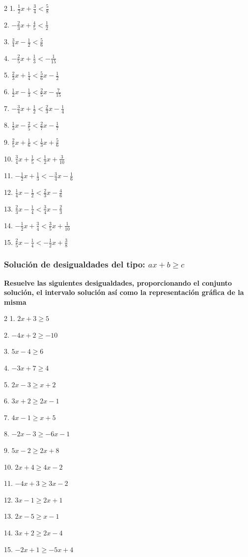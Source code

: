 \documentclass[12pt]{article}
\begin{document}
\begin{multicols}{2}
1. $\frac{1}{2}x+\frac{3}{4}<\frac{5}{8}$

2. $-\frac{2}{3}x+\frac{4}{5}<\frac{1}{2}$

3. $\frac{3}{4}x-\frac{1}{2}<\frac{5}{6}$

4. $-\frac{2}{5}x+\frac{1}{3}<-\frac{1}{15}$

5. $\frac{2}{3}x+\frac{1}{4}<\frac{5}{6}x-\frac{1}{2}$

6. $\frac{1}{2}x-\frac{1}{3}<\frac{2}{5}x-\frac{7}{15}$

7. $-\frac{3}{4}x+\frac{1}{2}<\frac{2}{3}x-\frac{1}{4}$

8. $\frac{1}{3}x-\frac{2}{5}<\frac{2}{7}x-\frac{1}{7}$

9. $\frac{2}{5}x+\frac{1}{6}<\frac{1}{3}x+\frac{5}{6}$

10. $\frac{3}{4}x+\frac{1}{5}<\frac{1}{2}x+\frac{3}{10}$

11. $-\frac{1}{2}x+\frac{1}{3}<-\frac{3}{4}x-\frac{1}{6}$

12. $\frac{1}{4}x-\frac{1}{2}<\frac{2}{3}x-\frac{4}{6}$

13. $\frac{2}{3}x-\frac{1}{4}<\frac{3}{4}x-\frac{2}{3}$

14. $-\frac{1}{2}x+\frac{3}{4}<\frac{3}{5}x+\frac{1}{10}$

15. $\frac{2}{5}x-\frac{1}{4}<-\frac{1}{2}x+\frac{3}{8}$
\end{multicols}

\subsubsection{\texorpdfstring{Solución de desigualdades del tipo:
\(ax+b \geq c\)}{Solución de desigualdades del tipo: ax+b \textbackslash geq c}}\label{soluciuxf3n-de-desigualdades-del-tipo-axb-geq-c}
\textbf{Resuelve las siguientes desigualdades, proporcionando el
conjunto solución, el intervalo solución así como la representación
gráfica de la misma}

\begin{multicols}{2}
1. $2x + 3 \geq 5$

2. $-4x + 2 \geq -10$

3. $5x - 4 \geq 6$

4. $-3x + 7 \geq 4$

5. $2x - 3 \geq x + 2$

6. $3x + 2 \geq 2x - 1$

7. $4x - 1 \geq x + 5$

8. $-2x - 3 \geq -6x - 1$

9. $5x - 2 \geq 2x + 8$

10. $2x + 4 \geq 4x - 2$

11. $-4x + 3 \geq 3x - 2$

12. $3x - 1 \geq 2x + 1$

13. $2x - 5 \geq x - 1$

14. $3x + 2 \geq 2x - 4$

15. $-2x + 1 \geq -5x + 4$
\end{multicols}
\end{document}

